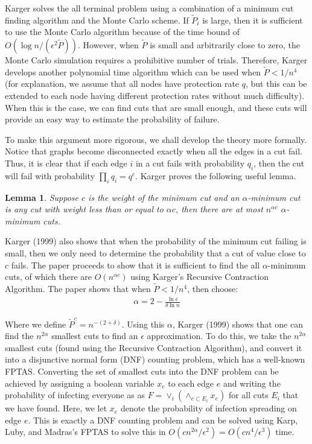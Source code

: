 \documentclass{article}
\theoremstyle{plain}
\newtheorem{lemma}{Lemma}
\begin{document}
Karger solves the all terminal problem using a combination of a minimum cut finding algorithm and the Monte Carlo scheme. If $\tilde{P}_i$ is large, then it is sufficient to use the Monte Carlo algorithm because of the time bound of $O(\log n / (\epsilon^2 \tilde{P}))$. However, when $\tilde{P}$ is small and arbitrarily close to zero, the Monte Carlo simulation requires a prohibitive number of trials. Therefore, Karger develops another polynomial time algorithm which can be used when $\tilde{P} < 1/n^4$ (for explanation, we assume that all nodes have protection rate $q$, but this can be extended to each node having different protection rates without much difficulty). When this is the case, we can find cuts that are small enough, and these cuts will provide an easy way to estimate the probability of failure.

To make this argument more rigorous, we shall develop the theory more formally. Notice that graphs become disconnected exactly when all the edges in a cut fail. Thus, it is clear that if each edge $i$ in a cut fails with probability $q_i$, then the cut will fail with probability $\prod_i q_i = q^c$. Karger proves the following useful lemma.

\begin{lemma}
  Suppose $c$ is the weight of the minimum cut and an $\alpha$-minimum cut is any cut with weight less than or equal to $\alpha c$, then there are at most $n^{\alpha c}$ $\alpha$-minimum cuts.
\end{lemma}

Karger (1999) also shows that when the probability of the minimum cut failing is small, then we only need to determine the probability that a cut of value close to $c$ fails. The paper proceeds to show that it is sufficient to find the all $\alpha$-minimum cuts, of which there are $O(n^{\alpha c})$ using Karger's Recursive Contraction Algorithm. The paper shows that when $\tilde{P} < 1/n^4$, then choose:
\begin{eqnarray}
  \alpha = 2 - \frac{\ln \epsilon}{\delta \ln n}
\end{eqnarray}

Where we define $\tilde{P}^c = n^{-(2 + \delta)}$. Using this $\alpha$, Karger (1999) shows that one can find the $n^{2 \alpha}$ smallest cuts to find an $\epsilon$ approximation. To do this, we take the $n^{2 \alpha}$ smallest cuts (found using the Recursive Contraction Algorithm), and convert it into a disjunctive normal form (DNF) counting problem, which has a well-known FPTAS. Converting the set of smallest cuts into the DNF problem can be achieved by assigning a boolean variable $x_e$ to each edge $e$ and writing the probability of infecting everyone as as $F = \vee_i (\wedge_{e \subset E_i} x_e)$ for all cuts $E_i$ that we have found. Here, we let $x_e$ denote the probability of infection spreading on edge $e$. This is exactly a DNF counting problem and can be solved using Karp, Luby, and Madras's FPTAS to solve this in $O(c n^{2 \alpha} / \epsilon^2) = O(c n^4 / \epsilon^3)$ time.
\end{document}
